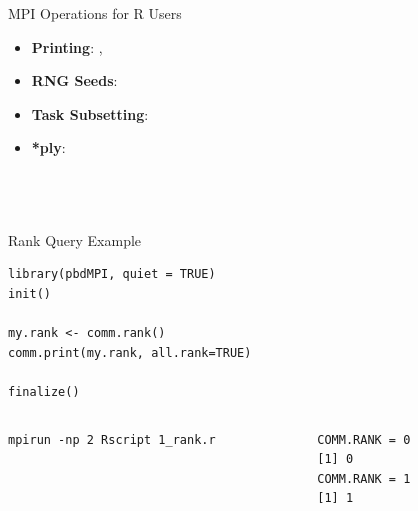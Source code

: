 \begin{frame}
  \begin{block}{MPI Operations for R Users}\pause
    \begin{itemize}
      \item \textbf{Printing}:  , \\[.4cm]
      \item \textbf{RNG Seeds}: \\[.4cm]
      \item \textbf{Task Subsetting}: \\[.4cm]
      \item \textbf{*ply}: \\
      \\
      \\
      \\
    \end{itemize}
  \end{block}
\end{frame}


\begin{frame}[fragile]
  \begin{exampleblock}{Rank Query Example}
  \centering
\begin{lstlisting}
library(pbdMPI, quiet = TRUE)
init()

my.rank <- comm.rank()
comm.print(my.rank, all.rank=TRUE)

finalize()
\end{lstlisting}
  \begin{columns}[t,onlytextwidth]
    \begin{column}{0.62\textwidth}
\begin{lstlisting}[backgroundcolor=\color{white},keywordstyle=\color{black},
title=Execute this script via:]
mpirun -np 2 Rscript 1_rank.r
\end{lstlisting}    
    \end{column}
    \hfill
    \begin{column}{0.35\textwidth}
\begin{lstlisting}[title=Sample Output:]
COMM.RANK = 0
[1] 0
COMM.RANK = 1
[1] 1
\end{lstlisting}
    \end{column}
​  \end{columns}
  \end{exampleblock}
\end{frame}

